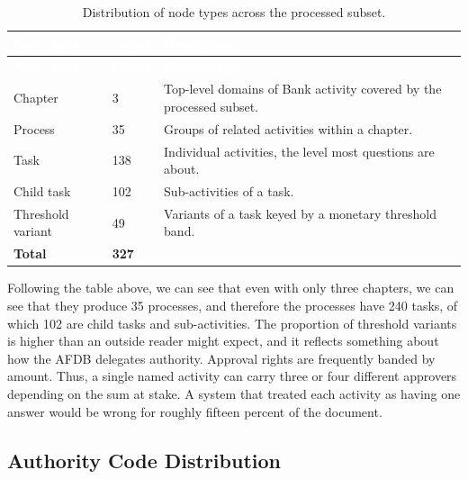 \begin{longtable}{|p{}|p{}|p{}|}
\caption{Distribution of node types across the processed subset.}\label{tab:nodedist}\\
\hline
\rowcolor{myblue}\textcolor{white}{\textbf{Node type}} & \textcolor{white}{\textbf{Count}} & \textcolor{white}{\textbf{Description}} \\
\hline
\endfirsthead
\hline
\rowcolor{myblue}\textcolor{white}{\textbf{Node type}} & \textcolor{white}{\textbf{Count}} & \textcolor{white}{\textbf{Description}} \\
\hline
\endhead
Chapter & 3 & Top-level domains of Bank activity covered by the processed subset. \\ \hline
Process & 35 & Groups of related activities within a chapter. \\ \hline
Task & 138 & Individual activities, the level most questions are about. \\ \hline
Child task & 102 & Sub-activities of a task. \\ \hline
Threshold variant & 49 & Variants of a task keyed by a monetary threshold band. \\ \hline
\textbf{Total} & \textbf{327} & \\ \hline
\end{longtable}


Following the table above, we can see that even with only three chapters, we can see that they produce 35 processes, and therefore the processes have 240 tasks, of which 102 are child tasks and sub-activities. The proportion of threshold variants is higher than an outside reader might expect, and it reflects something about how the AFDB delegates authority. Approval rights are frequently banded by amount. Thus, a single named activity can carry three or four different approvers depending on the sum at stake. A system that treated each activity as having one answer would be wrong for roughly fifteen percent of the document.

\subsection{Authority Code Distribution}


